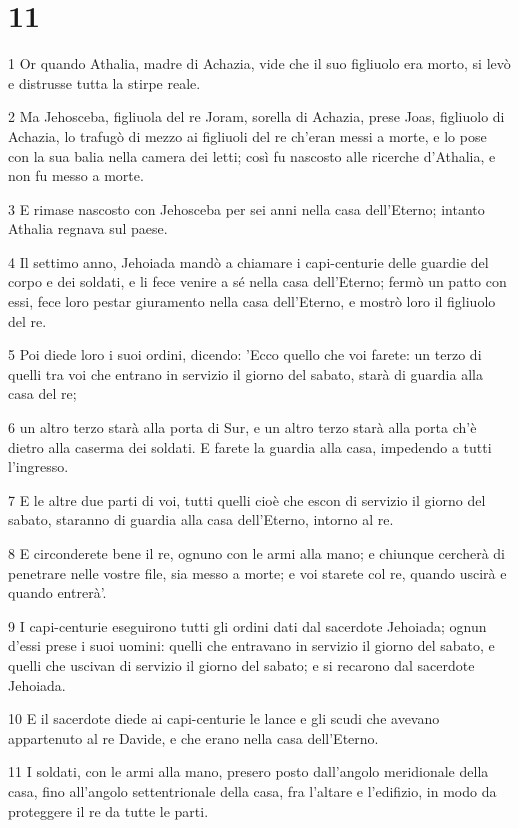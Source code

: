 \chapter{11}

\par 1 Or quando Athalia, madre di Achazia, vide che il suo figliuolo era morto, si levò e distrusse tutta la stirpe reale.
\par 2 Ma Jehosceba, figliuola del re Joram, sorella di Achazia, prese Joas, figliuolo di Achazia, lo trafugò di mezzo ai figliuoli del re ch'eran messi a morte, e lo pose con la sua balia nella camera dei letti; così fu nascosto alle ricerche d'Athalia, e non fu messo a morte.
\par 3 E rimase nascosto con Jehosceba per sei anni nella casa dell'Eterno; intanto Athalia regnava sul paese.
\par 4 Il settimo anno, Jehoiada mandò a chiamare i capi-centurie delle guardie del corpo e dei soldati, e li fece venire a sé nella casa dell'Eterno; fermò un patto con essi, fece loro pestar giuramento nella casa dell'Eterno, e mostrò loro il figliuolo del re.
\par 5 Poi diede loro i suoi ordini, dicendo: 'Ecco quello che voi farete: un terzo di quelli tra voi che entrano in servizio il giorno del sabato, starà di guardia alla casa del re;
\par 6 un altro terzo starà alla porta di Sur, e un altro terzo starà alla porta ch'è dietro alla caserma dei soldati. E farete la guardia alla casa, impedendo a tutti l'ingresso.
\par 7 E le altre due parti di voi, tutti quelli cioè che escon di servizio il giorno del sabato, staranno di guardia alla casa dell'Eterno, intorno al re.
\par 8 E circonderete bene il re, ognuno con le armi alla mano; e chiunque cercherà di penetrare nelle vostre file, sia messo a morte; e voi starete col re, quando uscirà e quando entrerà'.
\par 9 I capi-centurie eseguirono tutti gli ordini dati dal sacerdote Jehoiada; ognun d'essi prese i suoi uomini: quelli che entravano in servizio il giorno del sabato, e quelli che uscivan di servizio il giorno del sabato; e si recarono dal sacerdote Jehoiada.
\par 10 E il sacerdote diede ai capi-centurie le lance e gli scudi che avevano appartenuto al re Davide, e che erano nella casa dell'Eterno.
\par 11 I soldati, con le armi alla mano, presero posto dall'angolo meridionale della casa, fino all'angolo settentrionale della casa, fra l'altare e l'edifizio, in modo da proteggere il re da tutte le parti.
